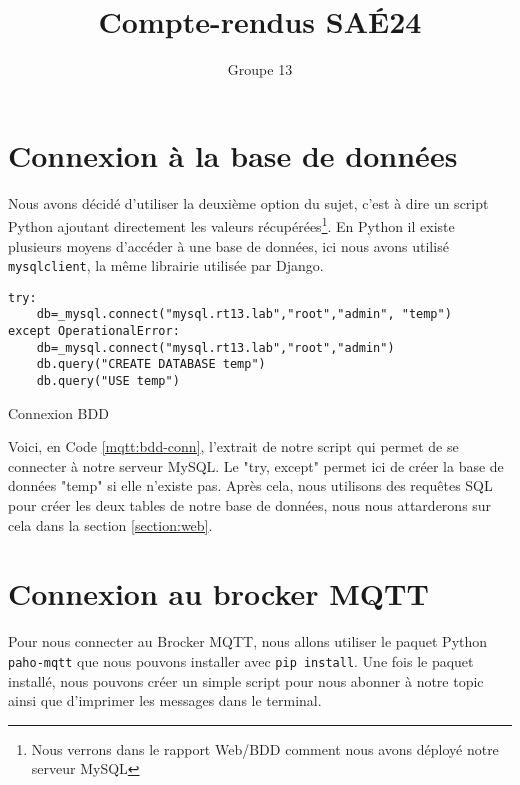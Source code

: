 \documentclass{article}
\author{Groupe 13}
\title{Compte-rendus SAÉ24}
\begin{document}
\maketitle
\tableofcontents
\listoflistings
\newpage
\section{Connexion à la base de données}
    Nous avons décidé d'utiliser la deuxième option du sujet, c'est à dire un script Python ajoutant directement les valeurs récupérées\footnote{Nous verrons dans le rapport Web/BDD comment nous avons déployé notre serveur MySQL}. 
    En Python il existe plusieurs moyens d'accéder à une base de données, ici nous avons utilisé \verb|mysqlclient|, la même librairie utilisée par Django.
    \begin{listing}[H]
        \begin{verbatim}
try:
    db=_mysql.connect("mysql.rt13.lab","root","admin", "temp")
except OperationalError:
    db=_mysql.connect("mysql.rt13.lab","root","admin")
    db.query("CREATE DATABASE temp")
    db.query("USE temp")
        \end{verbatim}
        \caption{Connexion BDD}
        \label{mqtt:bdd-conn}
    \end{listing}
    Voici, en Code \ref{mqtt:bdd-conn}, l'extrait de notre script qui permet de se connecter à notre serveur MySQL. Le "try, except" permet ici de créer la base de données "temp" si elle n'existe pas. Après cela, nous utilisons des requêtes SQL pour créer les deux tables de notre base de données, nous nous attarderons sur cela dans la section \ref{section:web}.
    \section{Connexion au brocker MQTT}
    Pour nous connecter au Brocker MQTT, nous allons utiliser le paquet Python \verb|paho-mqtt| que nous pouvons installer avec \verb|pip install|.
    Une fois le paquet installé, nous pouvons créer un simple script pour nous abonner à notre topic ainsi que d'imprimer les messages dans le terminal.
\end{document}
